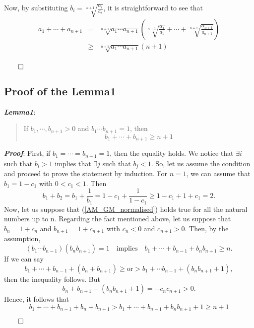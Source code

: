 \documentclass{article}
\begin{document}
Now, by substituting $b_i = \sqrt[n+1]{\frac{\alpha_i}{a_i}}$, it is straightforward to see that
\begin{eqnarray*}
a_1 + \cdots + a_{n+1} & = &  \sqrt[n+1]{a_1\cdots a_{n+1}} \left( \sqrt[n+1]{\frac{\alpha_1}{a_1}} + \cdots + \sqrt[n+1]{\frac{\alpha_{n+1}}{a_{n+1}}}\right) \nonumber \\
                       & \ge &  \sqrt[n+1]{a_1\cdots a_{n+1}} (n + 1 ) \nonumber \\
\end{eqnarray*}

\begin{right}
$\qed$
\end{right}
\subsection{Proof of the Lemma1}
\label{sec-1-4}
\textbf{\emph{Lemma1}}:
\begin{quote}
If $b_1, \cdots, b_{n+1} >0$ and $b_1 \cdots b_{n+1} = 1$, then
\begin{equation}
\label{AM_GM_normalised}
b_1 + \cdots + b_{n+1} \ge n+1
\end{equation}
\end{quote}
\textbf{\emph{Proof}}:
 First, if $b_1 = \cdots = b_{n+1} =1$, then the equality holds.
We notice that $\exists i$ such that $b_{i} > 1$ implies that $\exists j$ such that $b_{j} < 1$.
So, let us assume the condition and proceed to prove the statement by induction. 
For $n=1$, we can assume that $b_1 = 1-c_1$ with $0 < c_1 <1$. Then
\begin{equation*}
\label{ }
b_1 + b_2 = b_1 + \frac{1}{b_1} = 1 - c_1 + \frac{1}{1-c_1} \ge 1-c_1 + 1 + c_1 = 2.
\end{equation*}
Now, let us suppose that (\ref{AM_GM_normalised}) holds true for all the natural numbers up to n. Regarding the fact mentioned above, let us suppose that $b_n = 1 + c_n$ and $b_{n+1} = 1+c_{n+1}$ with $c_n < 0$ and $c_{n+1} > 0$. Then, by the assumption, 
\begin{equation*}
\label{ }
(b_1 \cdots b_{n-1})(b_n b_{n+1}) = 1 \quad \text{implies} \quad b_1 + \cdots + b_{n-1} + b_n b_{n+1} \ge n.
\end{equation*}
If we can say
\begin{equation*}
\label{ }
b_1 + \cdots + b_{n-1} + (b_n + b_{n+1}) \ge \text{or} > b_1 + \cdots b_{n-1} + (b_n b_{n+1} + 1),
\end{equation*}
then the inequality follows. But
\begin{equation*}
\label{ }
b_n + b_{n+1} - (b_n b_{n+1} + 1) = -c_n c_{n+1} > 0.
\end{equation*}
Hence, it follows that 
\begin{equation*}
\label{ }
b_1 + \cdots + b_{n-1} + b_n + b_{n+1} > b_1 + \cdots + b_{n-1} + b_n b_{n+1} + 1 \ge n + 1
\end{equation*}
\begin{right}
$\qed$\\
\end{right}
\end{document}
